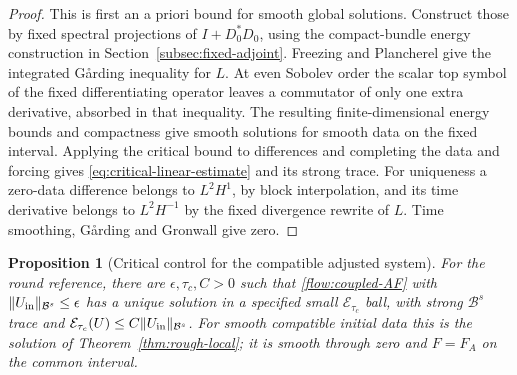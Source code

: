 \documentclass[11pt]{article}
\numberwithin{equation}{section}
\newtheorem{proposition}[theorem]{Proposition}
\theoremstyle{definition}
\theoremstyle{remark}
\begin{document}
\begin{proof}
This is first an a priori bound for smooth global
solutions. Construct those by fixed spectral projections
of $I+D_0^*D_0$, using the compact-bundle energy
construction in Section~\ref{subsec:fixed-adjoint}.
Freezing and Plancherel give the
integrated G{\aa}rding inequality for $L$.
At even Sobolev order the scalar top symbol of the
fixed differentiating operator leaves a commutator
of only one extra derivative, absorbed in that
inequality. The resulting finite-dimensional energy
bounds and compactness give smooth solutions for
smooth data on the fixed interval. Applying the
critical bound to differences and completing the
data and forcing gives \eqref{eq:critical-linear-estimate}
and its strong trace. For uniqueness a zero-data
difference belongs to $L^2H^1$, by block interpolation,
and its time derivative belongs to $L^2H^{-1}$ by
the fixed divergence rewrite of $L$.
Time smoothing, G{\aa}rding and Gronwall give zero.
\end{proof}

\begin{proposition}[Critical control for the compatible adjusted system]
\label{prop:critical-local}
For the round reference, there are $\epsilon,\tau_c,C>0$
such that \eqref{flow:coupled-AF} with
$\|U_{\rm in}\|_{\mathcal B^s}\le\epsilon$ has a unique
solution in a specified small $\mathcal E_{\tau_c}$ ball,
with strong $\mathcal B^s$ trace and
$\mathcal E_{\tau_c}(U)\le C\|U_{\rm in}\|_{\mathcal B^s}$.
For smooth compatible initial data this is the
solution of Theorem~\ref{thm:rough-local}; it is smooth
through zero and $F=F_A$ on the common interval.
\end{proposition}
\end{document}
